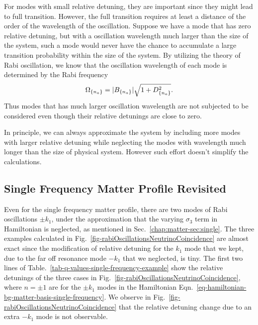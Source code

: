 For modes with small relative detuning, they are important since they might lead to full transition. However, the full transition requires at least a distance of the order of the wavelength of the oscillation. Suppose we have a mode that has zero relative detuning, but with a oscillation wavelength much larger than the size of the system, such a mode would never have the chance to accumulate a large transition probability within the size of the system. By utilizing the theory of Rabi oscillation, we know that the oscillation wavelength of each mode is determined by the Rabi frequency
\begin{equation}
\Omega_{\{n_a\}} = \lvert B_{\{n_a\}} \rvert \sqrt{1+D_{\{n_a\}}^2}.
\end{equation}
Thus modes that has much larger oscillation wavelength are not subjected to be considered even though their relative detunings are close to zero.

In principle, we can always approximate the system by including more modes with larger relative detuning while neglecting the modes with wavelength much longer than the size of physical system. However such effort doesn't simplify the calculations.


\subsection{\label{sec:single-revisted}Single Frequency Matter Profile Revisited}

Even for the single frequency matter profile, there are two modes of Rabi oscillations $\pm k_1$, under the approximation that the varying $\sigma_3$ term in Hamiltonian is neglected, as mentioned in Sec.~\ref{chap:matter-sec:single}. The three examples calculated in Fig.~\ref{fig-rabiOscillationsNeutrinoCoincidence} are almost exact since the modification of relative detuning for the $k_1$ mode that we kept, due to the far off resonance mode $-k_1$ that we neglected, is tiny. The first two lines of Table.~\ref{tab-q-values-single-frequency-example} show the relative detunings of the three cases in Fig.~\ref{fig-rabiOscillationsNeutrinoCoincidence}, where $n=\pm 1$ are for the $\pm k_1$ modes in the Hamiltonian Eqn.~\ref{eq-hamiltonian-bg-matter-basis-single-frequency}. We observe in Fig.~\ref{fig-rabiOscillationsNeutrinoCoincidence} that the relative detuning change due to an extra $-k_1$ mode is not observable.




